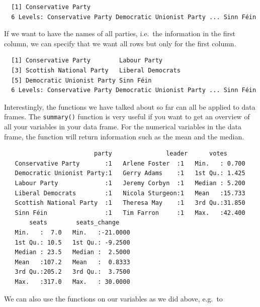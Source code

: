 \documentclass[12pt,oneside]{reedthesis}
\theoremstyle{definition}
\theoremstyle{definition}
\theoremstyle{definition}
\theoremstyle{remark}
\begin{document}
  \begin{verbatim}
  [1] Conservative Party
  6 Levels: Conservative Party Democratic Unionist Party ... Sinn Féin
  \end{verbatim}
  If we want to have the names of all parties, i.e.~the information in the
  first column, we can specify that we want all rows but only for the
  first column.
  \begin{Shaded}
  \begin{Highlighting}[]
  \NormalTok{uk2017[, }\NormalTok{] }
  \end{Highlighting}
  \end{Shaded}
  \begin{verbatim}
  [1] Conservative Party        Labour Party             
  [3] Scottish National Party   Liberal Democrats        
  [5] Democratic Unionist Party Sinn Féin                
  6 Levels: Conservative Party Democratic Unionist Party ... Sinn Féin
  \end{verbatim}
  Interestingly, the functions we have talked about so far can all be
  applied to data frames. The \texttt{summary()} function is very useful
  if you want to get an overview of all your variables in your data frame.
  For the numerical variables in the data frame, the function will return
  information such as the mean and the median.
  \begin{Shaded}
  \begin{Highlighting}[]
  \end{Highlighting}
  \end{Shaded}
  \begin{verbatim}
                         party               leader      votes       
   Conservative Party       :1   Arlene Foster  :1   Min.   : 0.700  
   Democratic Unionist Party:1   Gerry Adams    :1   1st Qu.: 1.425  
   Labour Party             :1   Jeremy Corbyn  :1   Median : 5.200  
   Liberal Democrats        :1   Nicola Sturgeon:1   Mean   :15.733  
   Scottish National Party  :1   Theresa May    :1   3rd Qu.:31.850  
   Sinn Féin                :1   Tim Farron     :1   Max.   :42.400  
       seats        seats_change     
   Min.   :  7.0   Min.   :-21.0000  
   1st Qu.: 10.5   1st Qu.: -9.2500  
   Median : 23.5   Median :  2.5000  
   Mean   :107.2   Mean   :  0.8333  
   3rd Qu.:205.2   3rd Qu.:  3.7500  
   Max.   :317.0   Max.   : 30.0000  
  \end{verbatim}
  We can also use the functions on our variables as we did above, e.g.~to
\end{document}
